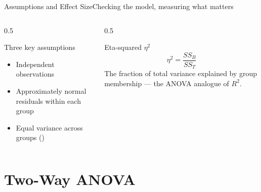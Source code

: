 \documentclass[aspectratio=169,11pt]{beamer}
\begin{document}
\begin{frame}{Assumptions and Effect Size}{Checking the model, measuring what matters}
  \begin{columns}[T]
    \begin{column}{0.5\textwidth}
      \begin{block}{Three key assumptions}
        \small
        \begin{itemize}
          \item Independent observations
          \item Approximately normal residuals within each group
          \item Equal variance across groups ()
        \end{itemize}
      \end{block}
    \end{column}
    \begin{column}{0.5\textwidth}
      \begin{exampleblock}{Eta-squared $\eta^2$}
        \[ \eta^2 = \frac{SS_B}{SS_T} \]
        \small The fraction of total variance explained by group
        membership — the ANOVA analogue of $R^2$.
      \end{exampleblock}
    \end{column}
  \end{columns}
\end{frame}

\section{Two-Way ANOVA}
\end{document}
